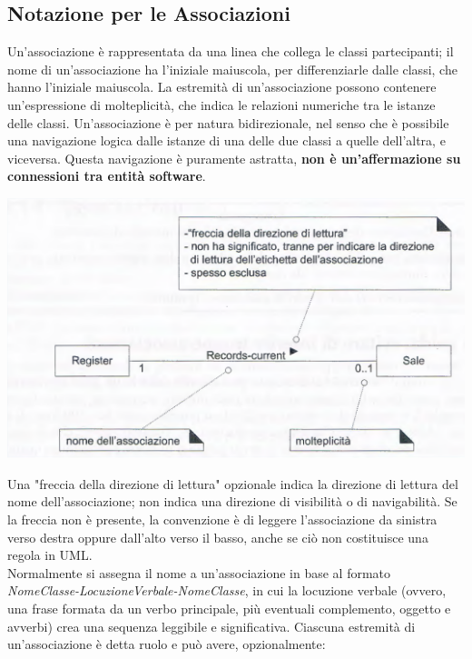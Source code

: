 \documentclass[a4paper,12pt, oneside]{book}
\begin{document}
\subsection{Notazione per le Associazioni}
Un'associazione è rappresentata da una linea che collega le classi partecipanti; il nome di un'associazione ha l'iniziale maiuscola, per differenziarle dalle classi, che hanno l'iniziale maiuscola. La estremità di un'associazione possono contenere un'espressione di molteplicità, che indica le relazioni numeriche tra le istanze delle classi.
Un'associazione è per natura bidirezionale, nel senso che è possibile una navigazione logica dalle istanze di una delle due classi a quelle dell'altra, e viceversa. Questa navigazione è puramente astratta, \textbf{non è un'affermazione su connessioni tra entità software}.
\begin{center}
	\includegraphics[scale=0.7]{img/asd1.png}
\end{center}
Una "freccia della direzione di lettura" opzionale indica la direzione di lettura del nome dell'associazione; non indica una direzione di visibilità o di navigabilità. Se la freccia non è presente, la convenzione è di leggere l'associazione da sinistra verso destra oppure dall'alto verso il basso, anche se ciò non costituisce una regola in UML.\\
Normalmente si assegna il nome a un'associazione in base al formato \textit{NomeClasse-LocuzioneVerbale-NomeClasse}, in cui la locuzione verbale (ovvero, una frase formata da un verbo principale, più eventuali complemento, oggetto e avverbi) crea una sequenza leggibile e significativa.
\newpage
Ciascuna estremità di un'associazione è detta ruolo e può avere, opzionalmente:
\end{document}
